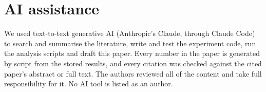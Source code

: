 \section{AI assistance}\label{sec:ai}
We used text-to-text generative AI (Anthropic's Claude, through Claude Code) to search and summarise
the literature, write and test the experiment code, run the analysis scripts and draft this paper.
Every number in the paper is generated by script from the stored results, and every citation was
checked against the cited paper's abstract or full text. The authors reviewed all of the content and take full
responsibility for it. No AI tool is listed as an author.
